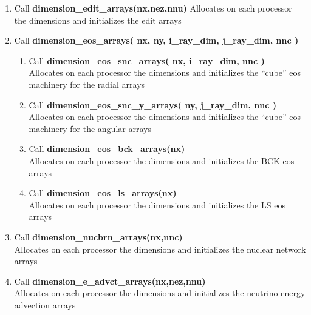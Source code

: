 \documentclass[11pt,doublespace]{article}
\begin{document}
\begin{itemize}
\begin{enumerate}
\begin{enumerate}
\begin{enumerate}
  \item Call {\bf dimension\_edit\_arrays(nx,nez,nnu)}
    Allocates on each processor  the dimensions and initializes the edit arrays
  \item Call {\bf dimension\_eos\_arrays( nx, ny, i\_ray\_dim, j\_ray\_dim, nnc )}
\begin{enumerate}
  \item Call {\bf dimension\_eos\_snc\_arrays( nx, i\_ray\_dim, nnc )}\\
    Allocates on each processor  the dimensions and initializes the ``cube'' eos machinery for the radial arrays
  \item Call {\bf dimension\_eos\_snc\_y\_arrays( ny, j\_ray\_dim, nnc )}\\
    Allocates on each processor  the dimensions and initializes the ``cube'' eos machinery for the angular arrays
  \item Call {\bf dimension\_eos\_bck\_arrays(nx)}\\
    Allocates on each processor  the dimensions and initializes the BCK eos arrays
  \item Call {\bf dimension\_eos\_ls\_arrays(nx)}\\
    Allocates on each processor  the dimensions and initializes the LS eos arrays
\end{enumerate}
  \item Call {\bf dimension\_nucbrn\_arrays(nx,nnc)}\\
    Allocates on each processor  the dimensions and initializes the nuclear network arrays
  \item Call {\bf dimension\_e\_advct\_arrays(nx,nez,nnu)}\\
    Allocates on each processor  the dimensions and initializes the neutrino energy advection arrays
\end{enumerate}


\end{enumerate}
\end{enumerate}
\end{itemize}
\end{document}
